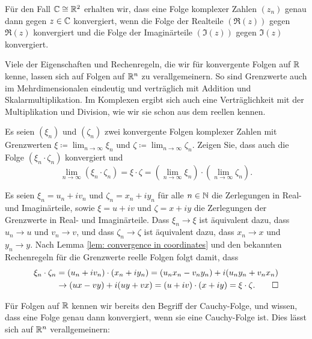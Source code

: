 \documentclass[a4paper,10pt]{article}
\begin{document}
\begin{bem}
 Für den Fall $\mathbb{C} \cong \mathbb{R}^2$ erhalten wir, dass eine Folge komplexer Zahlen $(z_n)$ genau dann gegen $z \in \mathbb{C}$ konvergiert, wenn die Folge der Realteile $(\Re(z))$ gegen $\Re(z)$ konvergiert und die Folge der Imaginärteile $(\Im(z))$ gegen $\Im(z)$ konvergiert.
\end{bem}


Viele der Eigenschaften und Rechenregeln, die wir für konvergente Folgen auf $\mathbb{R}$ kenne, lassen sich auf Folgen auf $\mathbb{R}^n$ zu verallgemeinern. So sind Grenzwerte auch im Mehrdimensionalen eindeutig und verträglich mit Addition und Skalarmultiplikation. Im Komplexen ergibt sich auch eine Verträglichkeit mit der Multiplikation und Division, wie wir sie schon aus dem reellen kennen.


\begin{question}
 Es seien $(\xi_n)$ und $(\zeta_n)$ zwei konvergente Folgen komplexer Zahlen mit Grenzwerten $\xi \coloneqq \lim_{n \to \infty} \xi_n$ und $\zeta \coloneqq \lim_{n \to \infty} \zeta_n$. Zeigen Sie, dass auch die Folge $(\xi_n \cdot \zeta_n)$ konvergiert und
 \[
  \lim_{n \to \infty} (\xi_n \cdot \zeta_n)
  = \xi \cdot \zeta
  = \left( \lim_{n \to \infty} \xi_n \right) \cdot \left( \lim_{n \to \infty} \zeta_n \right).
 \]
\end{question}
\begin{solution}
 Es seien $\xi_n = u_n + i v_n$ und $\zeta_n = x_n + i y_n$ für alle $n \in \mathbb{N}$ die Zerlegungen in Real- und Imaginärteile, sowie $\xi = u + i v$ und $\zeta = x + i y$ die Zerlegungen der Grenzwerte in Real- und Imaginärteile. Dass $\xi_n \to \xi$ ist äquivalent dazu, dass $u_n \to u$ und $v_n \to v$, und dass $\zeta_n \to \zeta$ ist äquivalent dazu, dass $x_n \to x$ und $y_n \to y$. Nach Lemma \ref{lem: convergence in coordinates} und den bekannten Rechenregeln für die Grenzwerte reelle Folgen folgt damit, dass
 \begin{align*}
  \xi_n \cdot \zeta_n
  &= (u_n + i v_n) \cdot (x_n + i y_n)
  = (u_n x_n - v_n y_n) + i (u_n y_n + v_n x_n) \\
  &\to (ux - vy) + i(uy + vx)
  = (u + iv) \cdot (x + iy)
  = \xi \cdot \zeta.
  \qedhere
 \end{align*}
\end{solution}


Für Folgen auf $\mathbb{R}$ kennen wir bereits den Begriff der Cauchy-Folge, und wissen, dass eine Folge genau dann konvergiert, wenn sie eine Cauchy-Folge ist. Dies lässt sich auf $\mathbb{R}^n$ verallgemeinern:
\end{document}
